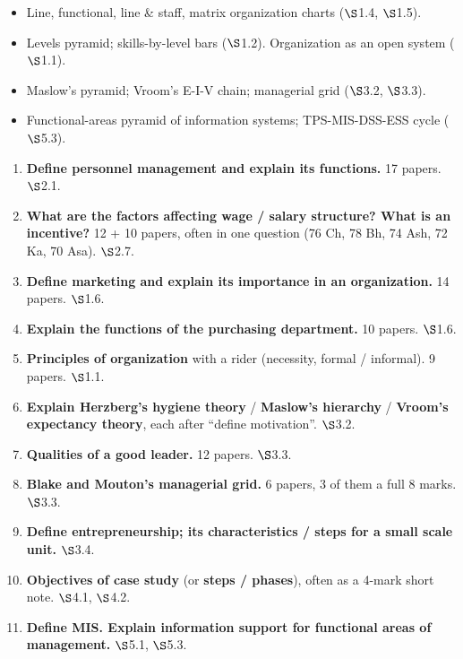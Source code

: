 \begin{itemize}
  \item Line, functional, line \& staff, matrix organization charts ($\S$1.4, $\S$1.5).
  \item Levels pyramid; skills-by-level bars ($\S$1.2). Organization as an open system ($\S$1.1).
  \item Maslow's pyramid; Vroom's E-I-V chain; managerial grid ($\S$3.2, $\S$3.3).
  \item Functional-areas pyramid of information systems; TPS-MIS-DSS-ESS cycle ($\S$5.3).
\end{itemize}

\par{}\vspace{4pt}


\begin{enumerate}
  \item \textbf{Define personnel management and explain its functions.} 17 papers. $\S$2.1.
  \item \textbf{What are the factors affecting wage / salary structure? What is an
    incentive?} 12 + 10 papers, often in one question (76 Ch, 78 Bh, 74 Ash, 72 Ka, 70 Asa).
    $\S$2.7.
  \item \textbf{Define marketing and explain its importance in an organization.} 14 papers.
    $\S$1.6.
  \item \textbf{Explain the functions of the purchasing department.} 10 papers. $\S$1.6.
  \item \textbf{Principles of organization} with a rider (necessity, formal / informal).
    9 papers. $\S$1.1.
  \item \textbf{Explain Herzberg's hygiene theory} / \textbf{Maslow's hierarchy} /
    \textbf{Vroom's expectancy theory}, each after ``define motivation''. $\S$3.2.
  \item \textbf{Qualities of a good leader.} 12 papers. $\S$3.3.
  \item \textbf{Blake and Mouton's managerial grid.} 6 papers, 3 of them a full 8 marks. $\S$3.3.
  \item \textbf{Define entrepreneurship; its characteristics / steps for a small scale unit.}
    $\S$3.4.
  \item \textbf{Objectives of case study} (or \textbf{steps / phases}), often as a 4-mark
    short note. $\S$4.1, $\S$4.2.
  \item \textbf{Define MIS. Explain information support for functional areas of management.}
    $\S$5.1, $\S$5.3.
\end{enumerate}

